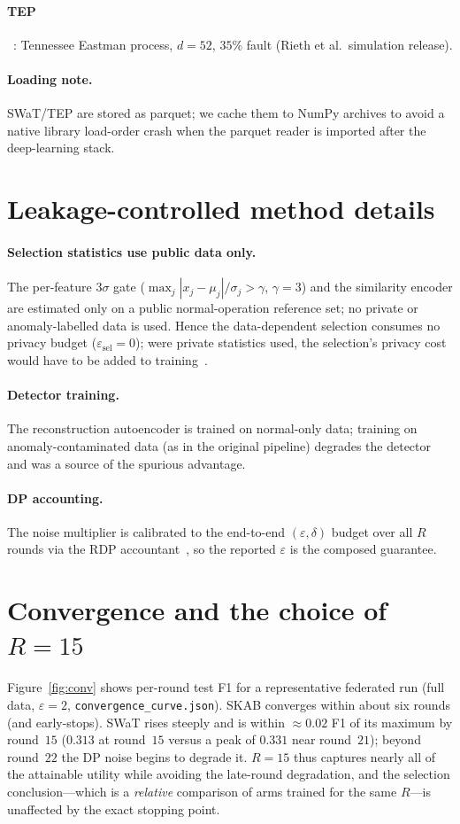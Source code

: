 \documentclass{article}
\begin{document}
\paragraph{TEP}~\cite{downs1993tep,rieth2017tep}: Tennessee Eastman process, $d{=}52$,
$35\%$ fault (Rieth et al.\ simulation release).
\paragraph{Loading note.} SWaT/TEP are stored as parquet; we cache them to NumPy archives
to avoid a native library load-order crash when the parquet reader is imported after the
deep-learning stack.

\section{Leakage-controlled method details}\label{supp:method}
\paragraph{Selection statistics use public data only.} The per-feature $3\sigma$ gate
($\max_j |x_j-\mu_j|/\sigma_j>\gamma$, $\gamma{=}3$) and the similarity encoder are
estimated only on a public normal-operation reference set; no private or anomaly-labelled
data is used. Hence the data-dependent selection consumes no privacy budget
($\varepsilon_{\text{sel}}{=}0$); were private statistics used, the selection's privacy
cost would have to be added to training~\cite{nguyen2025coreset}.
\paragraph{Detector training.} The reconstruction autoencoder is trained on normal-only
data; training on anomaly-contaminated data (as in the original pipeline) degrades the
detector and was a source of the spurious advantage.
\paragraph{DP accounting.} The noise multiplier is calibrated to the end-to-end
$(\varepsilon,\delta)$ budget over all $R$ rounds via the RDP
accountant~\cite{mironov2017renyi}, so the reported $\varepsilon$ is the composed guarantee.

\section{Convergence and the choice of $R{=}15$}\label{supp:conv}
Figure~\ref{fig:conv} shows per-round test F1 for a representative federated run
(full data, $\varepsilon{=}2$, \texttt{convergence\_curve.json}). SKAB converges within
about six rounds (and early-stops). SWaT rises steeply and is within $\approx0.02$ F1 of
its maximum by round~$15$ ($0.313$ at round~$15$ versus a peak of $0.331$ near
round~$21$); beyond round~$22$ the DP noise begins to degrade it. $R{=}15$ thus captures
nearly all of the attainable utility while avoiding the late-round degradation, and the
selection conclusion---which is a \emph{relative} comparison of arms trained for the
same $R$---is unaffected by the exact stopping point.
\end{document}
